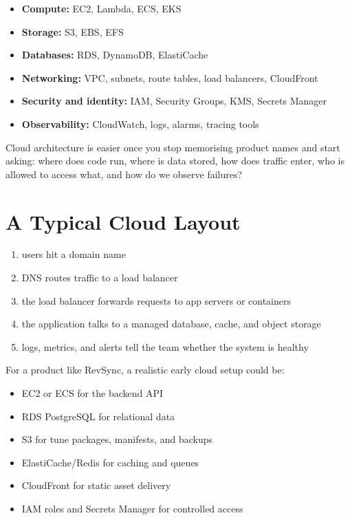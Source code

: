 \documentclass[12pt, a4paper, oneside]{book}
\begin{document}
\begin{itemize}[leftmargin=2em]
    \item \textbf{Compute:} EC2, Lambda, ECS, EKS
    \item \textbf{Storage:} S3, EBS, EFS
    \item \textbf{Databases:} RDS, DynamoDB, ElastiCache
    \item \textbf{Networking:} VPC, subnets, route tables, load balancers, CloudFront
    \item \textbf{Security and identity:} IAM, Security Groups, KMS, Secrets Manager
    \item \textbf{Observability:} CloudWatch, logs, alarms, tracing tools
\end{itemize}

\begin{intuitionbox}
Cloud architecture is easier once you stop memorising product names and start asking: where does code run, where is data stored, how does traffic enter, who is allowed to access what, and how do we observe failures?
\end{intuitionbox}

\section{A Typical Cloud Layout}

\begin{enumerate}[leftmargin=2em]
    \item users hit a domain name
    \item DNS routes traffic to a load balancer
    \item the load balancer forwards requests to app servers or containers
    \item the application talks to a managed database, cache, and object storage
    \item logs, metrics, and alerts tell the team whether the system is healthy
\end{enumerate}

\begin{projectbox}
For a product like RevSync, a realistic early cloud setup could be:
\begin{itemize}[leftmargin=2em]
    \item EC2 or ECS for the backend API
    \item RDS PostgreSQL for relational data
    \item S3 for tune packages, manifests, and backups
    \item ElastiCache/Redis for caching and queues
    \item CloudFront for static asset delivery
    \item IAM roles and Secrets Manager for controlled access
\end{itemize}
\end{projectbox}
\end{document}
